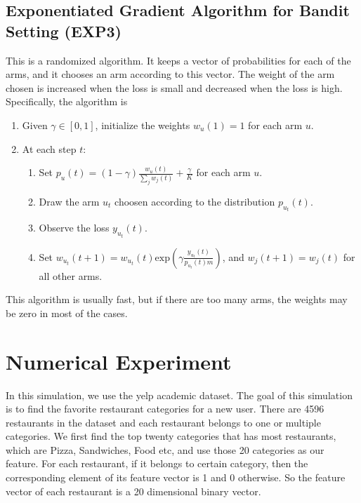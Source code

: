 \documentclass{article}
\theoremstyle{plain}
\theoremstyle{definition}
\begin{document}
\subsection{Exponentiated Gradient Algorithm for Bandit Setting (EXP3)}

This is a randomized algorithm. It keeps a vector of probabilities
for each of the arms, and it chooses an arm according to this vector.
The weight of the arm chosen is increased when the loss is small and
decreased when the loss is high. Specifically, the algorithm is
\begin{enumerate}
\item Given $\gamma\in\left[0,1\right]$, initialize the weights $w_{u}\left(1\right)=1$
for each arm $u$.
\item At each step $t$:

\begin{enumerate}
\item Set $p_{u}\left(t\right)=\left(1-\gamma\right)\frac{w_{u}\left(t\right)}{\sum_{j}w_{j}\left(t\right)}+\frac{\gamma}{K}$
for each arm $u$.
\item Draw the arm $u_{t}$ choosen according to the distribution $p_{u_{t}}\left(t\right)$.
\item Observe the loss $y_{u_{t}}\left(t\right)$.
\item Set $w_{u_{t}}\left(t+1\right)=w_{u_{t}}\left(t\right)\mbox{exp}\left(\gamma\frac{y_{u_{t}}\left(t\right)}{p_{u_{t}}\left(t\right)m}\right)$,
and $w_{j}\left(t+1\right)=w_{j}\left(t\right)$ for all other arms. 
\end{enumerate}
\end{enumerate}
This algorithm is usually fast, but if there are too many arms, the
weights may be zero in most of the cases. 



\section{Numerical Experiment}
In this simulation, we use the yelp academic dataset. The goal of this simulation is to find the favorite restaurant categories for a new user. There are 4596 restaurants in the dataset and each restaurant belongs to one or multiple categories. We first find the top twenty categories that has most restaurants, which are Pizza, Sandwiches, Food etc, and use those 20 categories as our feature. For each restaurant, if it belongs to certain category, then the corresponding element of its feature vector is 1 and 0 otherwise. So the feature vector of each restaurant is a 20 dimensional binary vector. 
\end{document}
